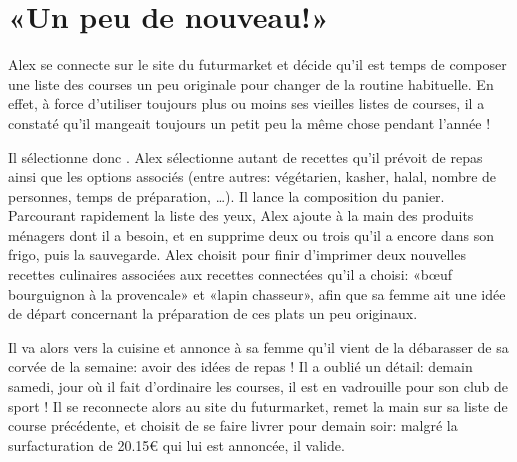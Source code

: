 \section{«Un peu de nouveau!»}
Alex se connecte sur le site du futurmarket et décide qu'il est temps de composer une liste des courses un peu originale pour changer de la routine habituelle.
En effet, à force d'utiliser toujours plus ou moins ses vieilles listes de courses, il a constaté qu'il mangeait toujours un petit peu la même chose pendant l'année !\par
Il sélectionne donc .
Alex sélectionne autant de recettes qu'il prévoit de repas ainsi que les options associés (entre autres: végétarien, kasher, halal, nombre de personnes, temps de préparation, \dots).
Il lance la composition du panier.
Parcourant rapidement la liste des yeux, Alex ajoute à la main des produits ménagers dont il a besoin, et en supprime deux ou trois qu'il a encore dans son frigo, puis la sauvegarde.
Alex choisit pour finir d'imprimer deux nouvelles recettes culinaires associées aux recettes connectées qu'il a choisi: «bœuf bourguignon à la provencale» et «lapin chasseur», afin que sa femme ait une idée de départ concernant la préparation de ces plats un peu originaux.
\par
Il va alors vers la cuisine et annonce à sa femme qu'il vient de la débarasser de sa corvée de la semaine: avoir des idées de repas !
Il a oublié un détail: demain samedi, jour où il fait d'ordinaire les courses, il est en vadrouille pour son club de sport !
Il se reconnecte alors au site du futurmarket, remet la main sur sa liste de course précédente, et choisit de se faire livrer pour demain soir: malgré la surfacturation de 20.15€ qui lui est annoncée, il valide.
